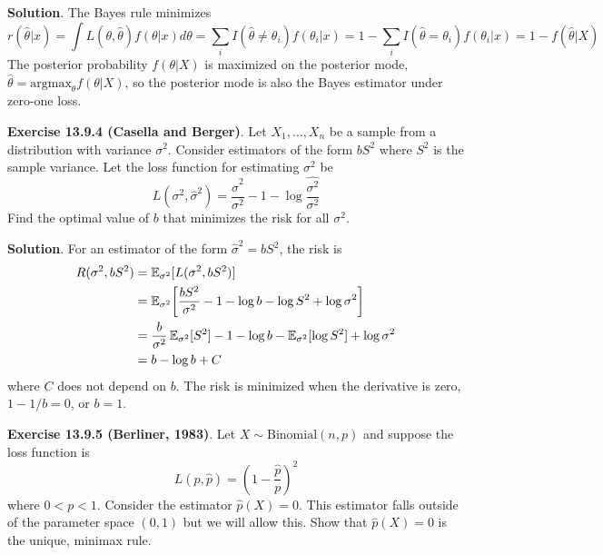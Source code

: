 \textbf{Solution}. The Bayes rule minimizes
\[
r(\hat{\theta} | x) = \int L(\theta, \hat{\theta}) f(\theta | x) d\theta = \sum_{i} I(\hat{\theta} \neq \theta_{i}) f(\theta_{i} | x) = 1 - \sum_{i} I(\hat{\theta} = \theta_{i}) f(\theta_{i} | x) = 1 - f(\hat{\theta} | X)
\]
The posterior probability \(f(\theta | X)\) is maximized on the
posterior mode, \(\hat{\theta} = \text{argmax}_\theta f(\theta | X)\),
so the posterior mode is also the Bayes estimator under zero-one loss.

\textbf{Exercise 13.9.4 (Casella and Berger)}. Let \(X_{1}, \dots, X_{n}\)
be a sample from a distribution with variance \(\sigma^{2}\). Consider
estimators of the form \(bS^{2}\) where \(S^{2}\) is the sample variance.
Let the loss function for estimating \(\sigma^{2}\) be
\[
L(\sigma^{2}, \hat{\sigma}^{2}) = \frac{\hat{\sigma}^{2}}{\sigma^{2}} - 1 - \log \frac{\hat{\sigma^{2}}}{\sigma^{2}}
\]
Find the optimal value of \(b\) that minimizes the risk for all
\(\sigma^{2}\).

\textbf{Solution}. For an estimator of the form
\(\hat{\sigma}^{2} = bS^{2}\), the risk is
\begin{align*}
R(\sigma^{2}, bS^{2}) &= \EXP_{\sigma^{2}}[ L(\sigma^{2}, bS^{2}) ]\\
&=\EXP_{\sigma^{2}}\left[\frac{bS^{2}}{\sigma^{2}} - 1 - \log b - \log S^{2} + \log \sigma^{2} \right] \\
&= \frac{b}{\sigma^{2}} \EXP_{\sigma^{2}}[S^{2}] - 1 -\log b - \EXP_{\sigma^{2}}[\log S^{2}] + \log \sigma^{2} \\
&= b - \log b + C
\end{align*}
where \(C\) does not depend on \(b\). The risk is minimized when the
derivative is zero, \(1 - 1/b = 0\), or \(b = 1\).

\textbf{Exercise 13.9.5 (Berliner, 1983)}. Let
\(X \sim \text{Binomial}(n, p)\) and suppose the loss function is
\[
L(p, \hat{p}) = \left(1 - \frac{\hat{p}}{p} \right)^{2}
\]
where \(0 < p < 1\). Consider the estimator \(\hat{p}(X) = 0\). This
estimator falls outside of the parameter space \((0, 1)\) but we will
allow this. Show that \(\hat{p}(X) = 0\) is the unique, minimax rule.

